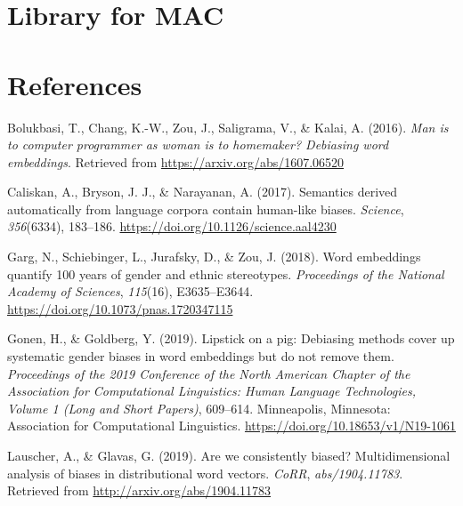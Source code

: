 \documentclass[
  10pt,
  dvipsnames,enabledeprecatedfontcommands, twocolumn]{scrartcl}
\newlength{\cslhangindent}
\newlength{\cslentryspacingunit} %
\newenvironment{CSLReferences}[2] %
 {%
  \setlength{\parindent}{0pt}
  \ifodd #1
  \let\oldpar\par
  \def\par{\hangindent=\cslhangindent\oldpar}
  \fi
  \setlength{\parskip}{#2\cslentryspacingunit}
 }%
 {}
\begin{document}


\hypertarget{library-for-mac}{%
\section{Library for MAC}\label{library-for-mac}}

\hypertarget{references}{%
\section*{References}\label{references}}

\hypertarget{refs}{}
\begin{CSLReferences}{1}{0}
\leavevmode{}%
Bolukbasi, T., Chang, K.-W., Zou, J., Saligrama, V., \& Kalai, A.
(2016). \emph{Man is to computer programmer as woman is to homemaker?
Debiasing word embeddings}. Retrieved from
\url{https://arxiv.org/abs/1607.06520}

\leavevmode{}%
Caliskan, A., Bryson, J. J., \& Narayanan, A. (2017). Semantics derived
automatically from language corpora contain human-like biases.
\emph{Science}, \emph{356}(6334), 183--186.
\url{https://doi.org/10.1126/science.aal4230}

\leavevmode{}%
Garg, N., Schiebinger, L., Jurafsky, D., \& Zou, J. (2018). Word
embeddings quantify 100 years of gender and ethnic stereotypes.
\emph{Proceedings of the National Academy of Sciences}, \emph{115}(16),
E3635--E3644. \url{https://doi.org/10.1073/pnas.1720347115}

\leavevmode{}%
Gonen, H., \& Goldberg, Y. (2019). Lipstick on a pig: {D}ebiasing
methods cover up systematic gender biases in word embeddings but do not
remove them. \emph{Proceedings of the 2019 Conference of the North
{A}merican Chapter of the Association for Computational Linguistics:
Human Language Technologies, Volume 1 (Long and Short Papers)},
609--614. Minneapolis, Minnesota: Association for Computational
Linguistics. \url{https://doi.org/10.18653/v1/N19-1061}

\leavevmode{}%
Lauscher, A., \& Glavas, G. (2019). Are we consistently biased?
Multidimensional analysis of biases in distributional word vectors.
\emph{CoRR}, \emph{abs/1904.11783}. Retrieved from
\url{http://arxiv.org/abs/1904.11783}


\end{CSLReferences}
\end{document}
